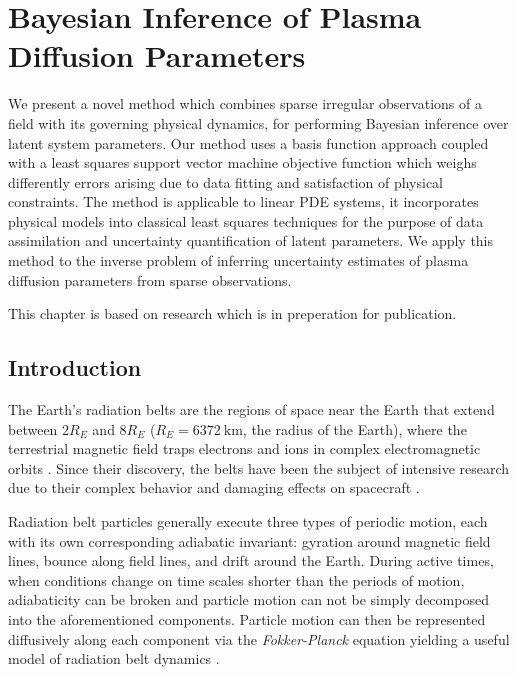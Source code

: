 \chapter{Bayesian Inference of Plasma Diffusion Parameters}\label{chapter:bayes_diff_chapter}

{\small
  We present a novel method which combines sparse irregular observations of a field with its 
  governing physical dynamics, for performing Bayesian inference over latent system parameters. Our 
  method uses a basis function approach coupled with a least squares support vector machine 
  objective function which weighs differently errors arising due to data fitting and satisfaction 
  of physical constraints. The method is applicable to linear PDE systems, it incorporates physical 
  models into classical least squares techniques for the purpose of data assimilation and 
  uncertainty quantification of latent parameters. We apply this method to the inverse problem of 
  inferring uncertainty estimates of plasma diffusion parameters from sparse observations.
}

\vfill
{}
\vfill

\noindent
    \parbox{\textwidth}{%
        {\small This chapter is based on research which is in preperation for publication.}
    }%


\clearpage


\section{Introduction}

The Earth's radiation belts are the regions of space near the Earth that extend between $2R_E$ 
and $8R_E$ ($R_E = \SI{6372}{\kilo\metre}$, the radius of the Earth), where the terrestrial 
magnetic field traps electrons and ions in complex electromagnetic orbits  \citep{vanAllen}. Since 
their discovery, the belts have been the subject of intensive research due to their complex 
behavior and damaging effects on spacecraft \citep{GUBBY20021723, WellingSatellite, baker2002}.

Radiation belt particles generally execute three types of periodic motion, each with its own 
corresponding adiabatic invariant: gyration around magnetic field lines, bounce along field lines, 
and drift around the Earth. During active times, when conditions change on time scales shorter than 
the periods of motion, adiabaticity can be broken and particle motion can not be simply decomposed 
into the aforementioned components. Particle motion can then be represented diffusively along each 
component via the \emph{Fokker-Planck} equation yielding a useful model of radiation belt dynamics 
\citep{schulz2012particle}.

